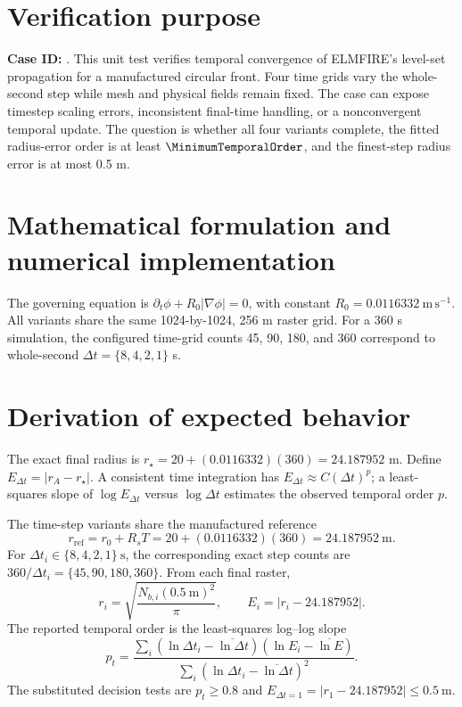 \section{Verification purpose}

\textbf{Case ID:} \texttt{\CaseID}. This unit test verifies temporal convergence of ELMFIRE's level-set propagation for a manufactured circular front. Four time grids vary the whole-second step while mesh and physical fields remain fixed. The case can expose timestep scaling errors, inconsistent final-time handling, or a nonconvergent temporal update. The question is whether all four variants complete, the fitted radius-error order is at least \(\MinimumTemporalOrder\), and the finest-step radius error is at most 0.5 m.

\section{Mathematical formulation and numerical implementation}

The governing equation is \(\partial_t\phi+R_0|\nabla\phi|=0\), with constant \(R_0=0.0116332~\mathrm{m\,s^{-1}}\). All variants share the same 1024-by-1024, 256 m raster grid. For a 360 s simulation, the configured time-grid counts 45, 90, 180, and 360 correspond to whole-second \(\Delta t=\{8,4,2,1\}\) s.

\section{Derivation of expected behavior}

The exact final radius is \(r_\star=20+(0.0116332)(360)=24.187952\) m. Define \(E_{\Delta t}=|r_A-r_\star|\). A consistent time integration has \(E_{\Delta t}\approx C(\Delta t)^p\); a least-squares slope of \(\log E_{\Delta t}\) versus \(\log\Delta t\) estimates the observed temporal order \(p\).

The time-step variants share the manufactured reference
\[
 r_{\mathrm{ref}}=r_0+R_sT
 =20+(0.0116332)(360)=24.187952~\mathrm{m}.
\]
For \(\Delta t_i\in\{8,4,2,1\}~\mathrm{s}\), the corresponding exact step
counts are \(360/\Delta t_i=\{45,90,180,360\}\).  From each final raster,
\[
 r_i=\sqrt{\frac{N_{b,i}(0.5~\mathrm{m})^2}{\pi}},\qquad
 E_i=|r_i-24.187952|.
\]
The reported temporal order is the least-squares log--log slope
\[
 p_t=\frac{\sum_i(\ln\Delta t_i-\overline{\ln\Delta t})
                    (\ln E_i-\overline{\ln E})}
              {\sum_i(\ln\Delta t_i-\overline{\ln\Delta t})^2}.
\]
The substituted decision tests are \(p_t\geq0.8\) and
\(E_{\Delta t=1}=|r_1-24.187952|\leq0.5~\mathrm{m}\).

